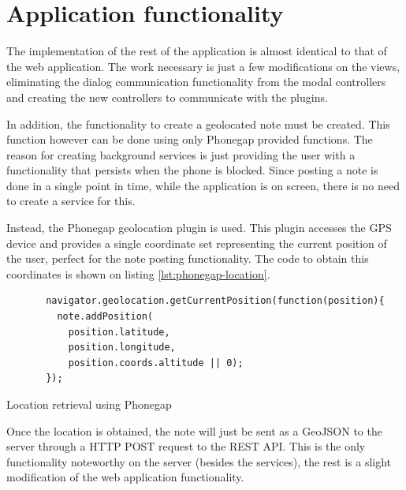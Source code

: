\section{Application functionality}

The implementation of the rest of the application is almost identical to that of the web application. The work necessary is just a few modifications on the views, eliminating the dialog communication functionality from the modal controllers and creating the new controllers to communicate with the plugins.

In addition, the functionality to create a geolocated note must be created. This function however can be done using only Phonegap provided functions. The reason for creating background services is just providing the user with a functionality that persists when the phone is blocked. Since posting a note is done in a single point in time, while the application is on screen, there is no need to create a service for this.

Instead, the Phonegap geolocation plugin is used. This plugin accesses the GPS device and provides a single coordinate set representing the current position of the user, perfect for the note posting functionality. The code to obtain this coordinates is shown on listing \ref{lst:phonegap-location}.

\begin{listing}[ht]\centering
  \begin{minipage}{.8\textwidth}
    \begin{verbatim}
       navigator.geolocation.getCurrentPosition(function(position){
         note.addPosition(
           position.latitude,  
           position.longitude, 
           position.coords.altitude || 0);
       });
    \end{verbatim}
  \end{minipage}
  \caption{Location retrieval using Phonegap}\label{lst:phonegap-location}
\end{listing}

Once the location is obtained, the note will just be sent as a GeoJSON to the server through a HTTP POST request to the REST API. This is the only functionality noteworthy on the server (besides the services), the rest is a slight modification of the web application functionality.